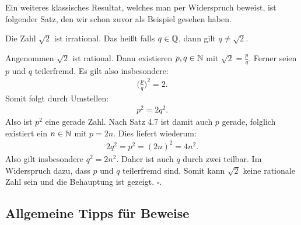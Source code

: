Ein weiteres klassisches Resultat, welches man per Widerspruch beweist, ist
folgender Satz, den wir schon zuvor als Beispiel gesehen haben.

\begin{theorem}
Die Zahl $\sqrt{2}$ ist irrational.
Das heißt falls $q \in \mathbb{Q}$, dann gilt $q \neq \sqrt{2}$.
\end{theorem}

\begin{proof*}
Angenommen $\sqrt{2}$ ist rational.
Dann existieren $p,q \in \mathbb{N}$ mit $\sqrt{2} = \frac{p}{q}$.
Ferner seien $p$ und $q$ teilerfremd.
Es gilt also insbesondere:
\begin{align*}
    \big(\frac{p}{q}\big)^2 = 2 .
\end{align*}
Somit folgt durch Umstellen:
\begin{align*}
    p^2 = 2q^2.
\end{align*}
Also ist $p^2$ eine gerade Zahl.
Nach Satz 4.7 ist damit auch $p$ gerade, folglich existiert ein $n \in \mathbb{N}$
mit $p = 2n$.
Dies liefert wiederum:
\begin{align*}
    2q^2 = p^2 = (2n)^2 = 4n^2.
\end{align*}
Also gilt insbesondere $q^2 = 2n^2$.
Daher ist auch $q$ durch zwei teilbar.
Im Widerspruch dazu, dass $p$ und $q$ teilerfremd sind.
Somit kann $\sqrt{2}$ keine rationale Zahl sein und die Behauptung ist gezeigt.
\hfill $\square$.
\end{proof*}

\subsection{Allgemeine Tipps für Beweise}


